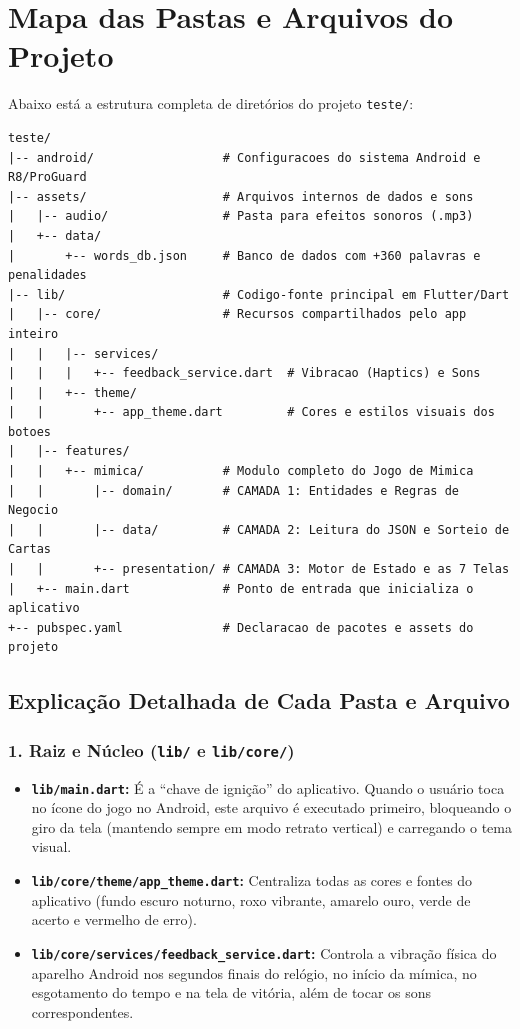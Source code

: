 \documentclass[12pt,a4paper]{article}
\begin{document}
\section{Mapa das Pastas e Arquivos do Projeto}

Abaixo está a estrutura completa de diretórios do projeto \texttt{teste/}:

\begin{lstlisting}
teste/
|-- android/                  # Configuracoes do sistema Android e R8/ProGuard
|-- assets/                   # Arquivos internos de dados e sons
|   |-- audio/                # Pasta para efeitos sonoros (.mp3)
|   +-- data/
|       +-- words_db.json     # Banco de dados com +360 palavras e penalidades
|-- lib/                      # Codigo-fonte principal em Flutter/Dart
|   |-- core/                 # Recursos compartilhados pelo app inteiro
|   |   |-- services/
|   |   |   +-- feedback_service.dart  # Vibracao (Haptics) e Sons
|   |   +-- theme/
|   |       +-- app_theme.dart         # Cores e estilos visuais dos botoes
|   |-- features/
|   |   +-- mimica/           # Modulo completo do Jogo de Mimica
|   |       |-- domain/       # CAMADA 1: Entidades e Regras de Negocio
|   |       |-- data/         # CAMADA 2: Leitura do JSON e Sorteio de Cartas
|   |       +-- presentation/ # CAMADA 3: Motor de Estado e as 7 Telas
|   +-- main.dart             # Ponto de entrada que inicializa o aplicativo
+-- pubspec.yaml              # Declaracao de pacotes e assets do projeto
\end{lstlisting}

\subsection{Explicação Detalhada de Cada Pasta e Arquivo}

\subsubsection{1. Raiz e Núcleo (\texttt{lib/} e \texttt{lib/core/})}
\begin{itemize}
  \item \textbf{\texttt{lib/main.dart}:} É a ``chave de ignição'' do aplicativo. Quando o usuário toca no ícone do jogo no Android, este arquivo é executado primeiro, bloqueando o giro da tela (mantendo sempre em modo retrato vertical) e carregando o tema visual.
  \item \textbf{\texttt{lib/core/theme/app\_theme.dart}:} Centraliza todas as cores e fontes do aplicativo (fundo escuro noturno, roxo vibrante, amarelo ouro, verde de acerto e vermelho de erro).
  \item \textbf{\texttt{lib/core/services/feedback\_service.dart}:} Controla a vibração física do aparelho Android nos segundos finais do relógio, no início da mímica, no esgotamento do tempo e na tela de vitória, além de tocar os sons correspondentes.
\end{itemize}
\end{document}
